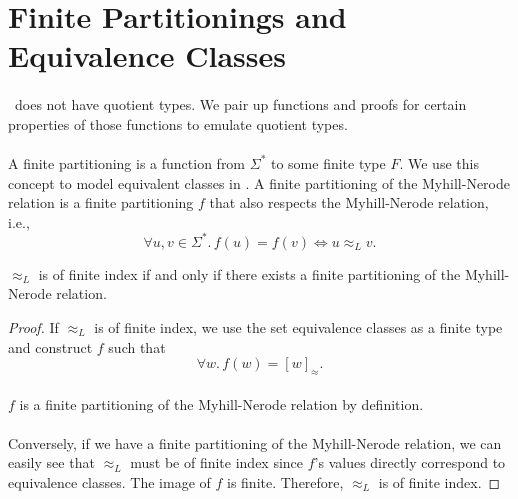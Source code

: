 \documentclass[11pt,a4paper,oneside]{book}
\begin{document}
            \section{Finite Partitionings and Equivalence Classes}

                \paragraph{}
                    \coq\ does not have quotient types. 
                    We pair up functions and proofs for certain properties of those functions to emulate quotient types.

                \paragraph{} 
                    A finite partitioning is a function from $\Sigma^*$ to some finite type $F$. 
                    We use this concept to model equivalent classes in \coq. 
                    A finite partitioning of the Myhill-Nerode relation is a finite partitioning $f$ that also respects the Myhill-Nerode relation, i.e.,
                    \[
                        \forall u, v \in \Sigma^*. \,
                        f(u) = f(v) \Leftrightarrow u \approx_L v.
                    \]
                    


                    \begin{theorem}
                        $\approx_L$ is of finite index if and only if there exists a finite partitioning of the Myhill-Nerode relation.
                    \end{theorem}

                    \begin{proof}
                        If $\approx_L$ is of finite index, we use the set equivalence classes as a finite type and construct $f$ such that
                        \[
                            \forall w.\, f(w) = [w]_\approx.
                        \]
                        \paragraph{}
                        $f$ is a finite partitioning of the Myhill-Nerode relation by definition.

                        \paragraph{}
                        Conversely, if we have a finite partitioning of the Myhill-Nerode relation, we can easily see that $\approx_L$ must be of finite index since $f$'s values directly correspond to equivalence classes. The image of $f$ is finite. Therefore, $\approx_L$ is of finite index.
                    \end{proof}
\end{document}
